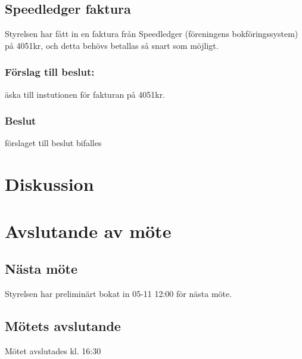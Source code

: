 \documentclass[protokoll]{dvd}
\begin{document}
\subsection{Speedledger faktura}
Styrelsen har fått in en faktura från Speedledger (föreningens bokföringssystem)
på 4051kr, och detta behövs betallas så snart som möjligt.

\subsubsection*{Förslag till beslut:}
\begin{attsatser}
    \item äska till instutionen för fakturan på 4051kr.
\end{attsatser}

\subsubsection*{Beslut}
\begin{attsatser}
    \item förslaget till beslut bifalles
\end{attsatser}

\section{Diskussion}

\newpage
\section{Avslutande av möte}

\subsection{Nästa möte}
Styrelsen har preliminärt bokat in 05-11 12:00 för nästa möte.

\subsection{Mötets avslutande}
Mötet avslutades kl. 16:30

\styrelsesignaturer
\end{document}
